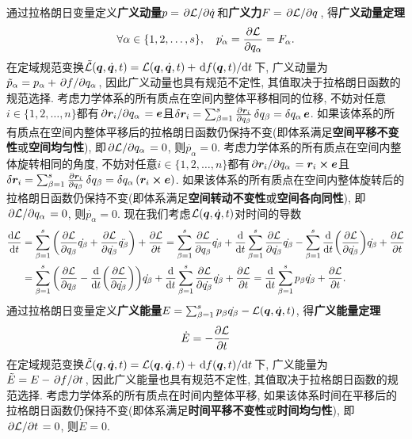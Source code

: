 通过拉格朗日变量定义\textbf{广义动量}$ p=\pdv*{\mathcal{L}}{\dot{q}} $和\textbf{广义力}$ F=\pdv*{\mathcal{L}}{q} $, 得\textbf{广义动量定理}
\begin{equation}
    \forall \alpha \in \{1,2,\ldots,s\}, \quad\dot{p_{\alpha}}=\pdv{\mathcal{L}}{q_{\alpha}}=F_{\alpha}.
\end{equation}
在定域规范变换$ \tilde{\mathcal{L}}(\vb*{q},\dot{\vb*{q}},t)=\mathcal{L}(\vb*{q},\dot{\vb*{q}},t)+\dv*{f(\vb*{q},t)}{t} $下, 广义动量为$ \tilde{p}_{\alpha}=p_{\alpha}+\pdv*{f}{q_{\alpha}} $, 因此广义动量也具有规范不定性, 其值取决于拉格朗日函数的规范选择. 考虑力学体系的所有质点在空间内整体平移相同的位移, 不妨对任意$ i \in \{1,2,\ldots,n\} $都有$ \pdv*{\vb*{r}_i}{q_{\alpha}}=\vb*{e} $且$ \var{\vb*{r}_i} = \sum_{\beta=1}^s \pdv{\vb*{r}_i}{q_{\beta}} \var{q_{\beta}} = \var{q_{\alpha}} \vb*{e} $. 如果该体系的所有质点在空间内整体平移后的拉格朗日函数仍保持不变(即体系满足\textbf{空间平移不变性}或\textbf{空间均匀性}), 即$ \pdv*{\mathcal{L}}{q_{\alpha}}=0 $, 则$ \dot{p_{\alpha}}=0 $. 考虑力学体系的所有质点在空间内整体旋转相同的角度, 不妨对任意$ i \in \{1,2,\ldots,n\} $都有$ \pdv*{\vb*{r}_i}{q_{\alpha}}=\vb*{r}_i \cross \vb*{e} $且$ \var{\vb*{r}_i} = \sum_{\beta=1}^s \pdv{\vb*{r}_i}{q_{\beta}} \var{q_{\beta}} = \var{q_{\alpha}} (\vb*{r}_i \cross \vb*{e}) $. 如果该体系的所有质点在空间内整体旋转后的拉格朗日函数仍保持不变(即体系满足\textbf{空间转动不变性}或\textbf{空间各向同性}), 即$ \pdv*{\mathcal{L}}{q_{\alpha}}=0 $, 则$ \dot{p_{\alpha}}=0 $. 现在我们考虑$ \mathcal{L}(\vb*{q},\dot{\vb*{q}},t) $对时间的导数
\begin{align*}
    \dv{\mathcal{L}}{t} &= \sum_{\beta=1}^s \bigg(\pdv{\mathcal{L}}{q_{\beta}}\dot{q_{\beta}} + \pdv{\mathcal{L}}{\dot{q_{\beta}}} \ddot{q_{\beta}} \bigg) + \pdv{\mathcal{L}}{t} = \sum_{\beta=1}^s \pdv{\mathcal{L}}{q_{\beta}}\dot{q_{\beta}} + \dv{t} \sum_{\beta=1}^s \pdv{\mathcal{L}}{\dot{q_{\beta}}} \dot{q_{\beta}} - \sum_{\beta=1}^s \dv{t}(\pdv{\mathcal{L}}{\dot{q_{\beta}}}) \dot{q_{\beta}} + \pdv{\mathcal{L}}{t} \\
    &=\sum_{\beta=1}^s \bigg(\pdv{\mathcal{L}}{q_{\beta}} - \dv{t}(\pdv{\mathcal{L}}{\dot{q_{\beta}}}) \bigg)\dot{q_{\beta}} + \dv{t} \sum_{\beta=1}^s \pdv{\mathcal{L}}{\dot{q_{\beta}}} \dot{q_{\beta}} + \pdv{\mathcal{L}}{t} = \dv{t} \sum_{\beta=1}^s p_{\beta} \dot{q_{\beta}} + \pdv{\mathcal{L}}{t}.
\end{align*}
通过拉格朗日变量定义\textbf{广义能量}$ E=\sum_{\beta=1}^s p_{\beta}\dot{q_{\beta}} - \mathcal{L}(\vb*{q},\dot{\vb*{q}},t) $, 得\textbf{广义能量定理}
\begin{equation}
    \dot{E}=-\pdv{\mathcal{L}}{t}
\end{equation}
在定域规范变换$ \tilde{\mathcal{L}}(\vb*{q},\dot{\vb*{q}},t)=\mathcal{L}(\vb*{q},\dot{\vb*{q}},t)+\dv*{f(\vb*{q},t)}{t} $下, 广义能量为$ \tilde{E}=E-\pdv*{f}{t} $, 因此广义能量也具有规范不定性, 其值取决于拉格朗日函数的规范选择. 考虑力学体系的所有质点在时间内整体平移, 如果该体系时间在平移后的拉格朗日函数仍保持不变(即体系满足\textbf{时间平移不变性}或\textbf{时间均匀性}), 即$ \pdv*{\mathcal{L}}{t}=0 $, 则$ \dot{E}=0 $.

